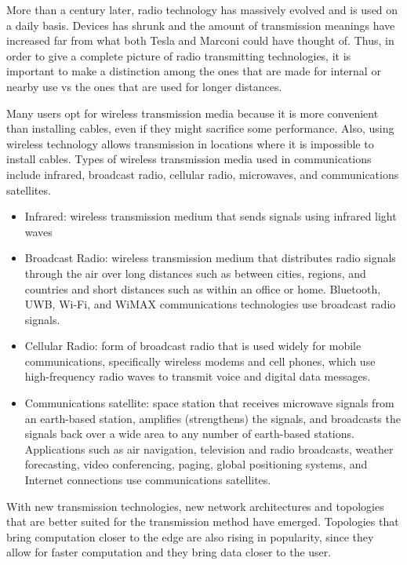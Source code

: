 	More than a century later, radio technology has massively evolved and is used on a daily basis.
	Devices has shrunk and the amount of transmission meanings have increased far from what both Tesla and Marconi could have thought of.
	Thus, in order to give a complete picture of radio transmitting technologies, it is important to make a distinction among the ones that are made for internal or nearby use vs the ones that are used for longer distances.
	
	Many users opt for wireless transmission media because it is more convenient than installing cables, even if they might sacrifice some performance. 
	Also, using wireless technology allows transmission in locations where it is impossible to install cables.
	Types of wireless transmission media used in communications include infrared, broadcast radio, cellular radio, microwaves, and communications satellites.
	\begin{itemize}[noitemsep]
		\item Infrared: wireless transmission medium that sends signals using infrared light waves
		\item Broadcast Radio: wireless transmission medium that distributes radio signals through the air over long distances such as between cities, regions, and countries and short distances such as within an office or home. Bluetooth, UWB, Wi-Fi, and WiMAX communications technologies use broadcast radio signals.
		\item Cellular Radio: form of broadcast radio that is used widely for mobile communications, specifically wireless modems and cell phones, which use high-frequency radio waves to transmit voice and digital data messages.
		\item Communications satellite: space station that receives microwave signals from an earth-based station, amplifies (strengthens) the signals, and broadcasts the signals back over a wide area to any number of earth-based stations.
		Applications such as air navigation, television and radio broadcasts, weather forecasting, video conferencing, paging, global positioning systems, and Internet connections use communications satellites.
	\end{itemize}
	
	With new transmission technologies, new network architectures and topologies that are better suited for the transmission method have emerged.
	Topologies that bring computation closer to the edge are also rising in popularity, since they allow for faster computation and they bring data closer to the user.
	
